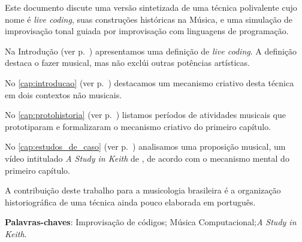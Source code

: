
\setlength{\absparsep}{18pt} %
\begin{resumo}

Este documento discute uma versão sintetizada de uma técnica polivalente cujo nome é \emph{live coding}, suas construções históricas na Música, e uma simulação de improvisação tonal guiada por improvisação com linguagens de programação.

Na Introdução (ver p.~\pageref{cap:intro}) apresentamos uma definição de \emph{live coding}. A definição destaca o fazer musical, mas não exclúi outras potências artísticas. 

No \autoref{cap:introducao} (ver p.~\pageref{cap:introducao}) destacamos um mecanismo criativo desta técnica em dois contextos não musicais.

No \autoref{cap:protohistoria} (ver p.~\pageref{cap:protohistoria}) listamos  períodos de atividades musicais que prototiparam e formalizaram o mecanismo criativo do primeiro capítulo.

No \autoref{cap:estudos_de_caso} (ver p.~\pageref{cap:estudos_de_caso}) analisamos uma proposição musical, 
um vídeo intitulado \emph{A Study in Keith} de , de acordo com o mecanismo mental do primeiro capítulo.

A contribuição deste trabalho para a musicologia brasileira é a organização historiográfica de uma técnica ainda pouco elaborada em português.

\vspace{\onelineskip}
\noindent
\textbf{Palavras-chaves}: Improvisação de códigos; Música Computacional;\emph{A Study in Keith}.
\end{resumo}

